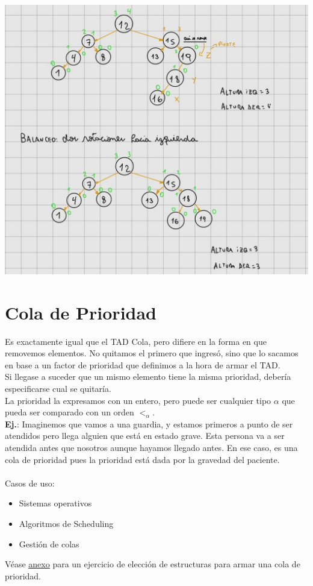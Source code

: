 \documentclass[10pt,a4paper]{article}
\begin{document}
\begin{center}
    \begin{minipage}[b]{0.7\textwidth}
        \includegraphics[width=\linewidth]{assets/balanceo_avl.jpg}
        \centering
        \label{fig:balanceo_avl}
    \end{minipage}
\end{center}
\section*{Cola de Prioridad}
Es exactamente igual que el TAD Cola, pero difiere en la forma en que removemos elementos. No quitamos el primero que ingresó, sino que lo sacamos en base a un factor de prioridad que definimos a la hora de armar el TAD. \\ 
Si llegase a suceder que un mismo elemento tiene la misma prioridad, debería especificarse cual se quitaría. \\ 
La prioridad la expresamos con un entero, pero puede ser cualquier tipo $ \alpha$ que pueda ser comparado con un orden $<_{\alpha}$. \\

\textbf{Ej.}: Imaginemos que vamos a una guardia, y estamos primeros a punto de ser atendidos pero llega alguien que está en estado grave. Esta persona va a ser atendida antes que nosotros aunque hayamos llegado antes. En ese caso, es una cola de prioridad pues la prioridad está dada por la gravedad del paciente. \\ \\ 
Casos de uso: 
\begin{itemize}
    \item Sistemas operativos
    \item Algoritmos de Scheduling
    \item Gestión de colas
\end{itemize}
Véase \hyperref[subsec:cola_de_prioridad_avl]{\underline{anexo}} para un ejercicio de elección de estructuras para armar una cola de prioridad.
\end{document}
